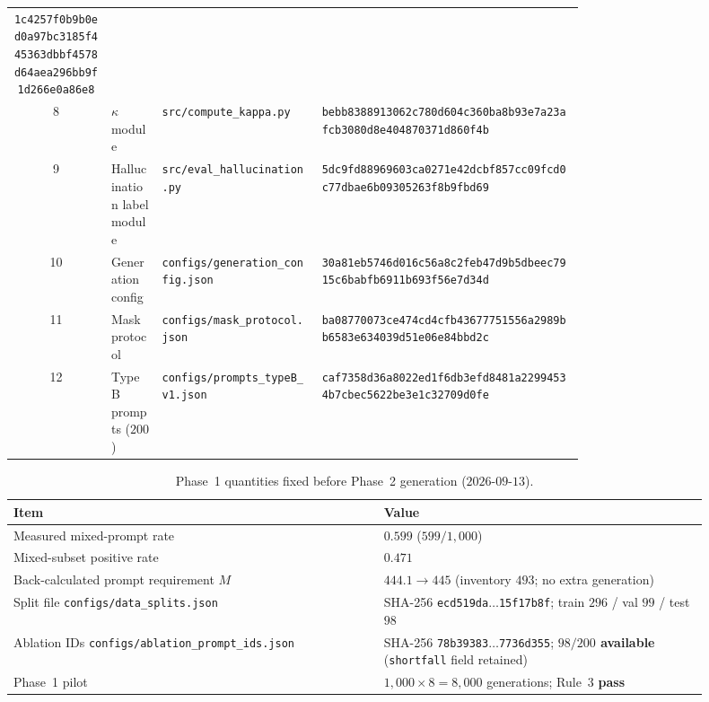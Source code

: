 \documentclass{article}
\begin{document}
\begin{table}[t]
\begin{tabular}{@{}clp{0.28\linewidth}p{0.46\linewidth}@{}}
\texttt{\linebreak[0]1c4257f0b9b0ed0a97bc3185}\linebreak\texttt{f445363dbbf4578d64aea296bb9f1d266e0a86e8} \\
8 & $\kappa$ module & \texttt{src/compute\_kappa.py} &
\texttt{\linebreak[0]bebb8388913062c780d604c3}\linebreak\texttt{60ba8b93e7a23afcb3080d8e404870371d860f4b} \\
9 & Hallucination label module & \texttt{src/eval\_hallucination.py} &
\texttt{\linebreak[0]5dc9fd88969603ca0271e42d}\linebreak\texttt{cbf857cc09fcd0c77dbae6b09305263f8b9fbd69} \\
10 & Generation config & \texttt{configs/generation\_config.json} &
\texttt{\linebreak[0]30a81eb5746d016c56a8c2fe}\linebreak\texttt{b47d9b5dbeec7915c6babfb6911b693f56e7d34d} \\
11 & Mask protocol & \texttt{configs/mask\_protocol.json} &
\texttt{\linebreak[0]ba08770073ce474cd4cfb436}\linebreak\texttt{77751556a2989bb6583e634039d51e06e84bbd2c} \\
12 & Type~B prompts ($200$) & \texttt{configs/prompts\_typeB\_v1.json} &
\texttt{\linebreak[0]caf7358d36a8022ed1f6db3e}\linebreak\texttt{fd8481a22994534b7cbec5622be3e1c32709d0fe} \\
\bottomrule
\end{tabular}
\end{table}

\begin{table}[t]
\centering
\caption{Phase~1 quantities fixed before Phase~2 generation ($2026$-$09$-$13$).}
\label{tab:phase1}
\small
\begin{tabular}{@{}p{0.48\linewidth}p{0.42\linewidth}@{}}
\toprule
Item & Value \\
\midrule
Measured mixed-prompt rate & $0.599$ ($599/1{,}000$) \\
Mixed-subset positive rate & $0.471$ \\
Back-calculated prompt requirement $M$ & $444.1\rightarrow 445$ (inventory $493$; no extra generation) \\
Split file \texttt{configs/data\_splits.json} & {SHA-256} \texttt{ecd519da}$\ldots$\texttt{15f17b8f}; train $296$ / val $99$ / test $98$ \\
Ablation {IDs} \texttt{configs/ablation\_prompt\_ids.json} & {SHA-256} \texttt{78b39383}$\ldots$\texttt{7736d355}; \textbf{$98/200$ available} (\texttt{shortfall} field retained) \\
Phase~1 pilot & $1{,}000\times 8=8{,}000$ generations; Rule~3 \textbf{pass} \\
\bottomrule
\end{tabular}
\end{table}
\end{document}
